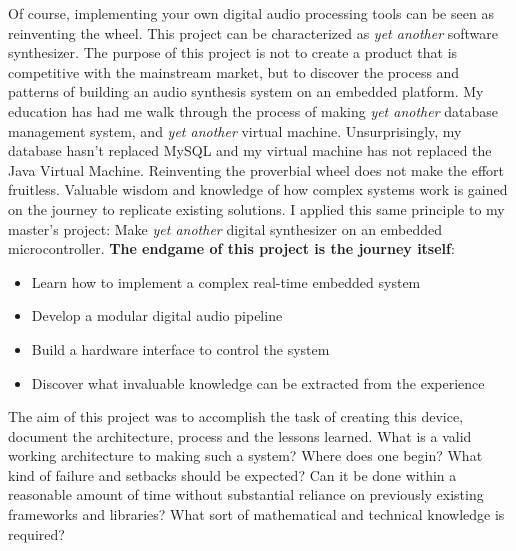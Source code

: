 \documentclass[acmlarge,screen]{acmart}
\begin{document}
	Of course, implementing your own digital audio processing tools can be seen as reinventing the wheel. This project can be characterized as \textit{yet another} software synthesizer. The purpose of this project is not to create a product that is competitive with the mainstream market, but to discover the process and patterns of building an audio synthesis system on an embedded platform. My education has had me walk through the process of making \textit{yet another} database management system, and \textit{yet another} virtual machine. Unsurprisingly, my database hasn't replaced MySQL and my virtual machine has not replaced the Java Virtual Machine. Reinventing the proverbial wheel does not make the effort fruitless. Valuable wisdom and knowledge of how complex systems work is gained on the journey to replicate existing solutions. I applied this same principle to my master's project: Make \textit{yet another} digital synthesizer on an embedded microcontroller. \textbf{The endgame of this project is the journey itself}:
	\begin{itemize}
		\item Learn how to implement a complex real-time embedded system
		\item Develop a modular digital audio pipeline
		\item Build a hardware interface to control the system
		\item Discover what invaluable knowledge can be extracted from the experience
	\end{itemize}
	The aim of this project was to accomplish the task of creating this device, document the architecture, process and the lessons learned. What is a valid working architecture to making such a system? Where does one begin? What kind of failure and setbacks should be expected? Can it be done within a reasonable amount of time without substantial reliance on previously existing frameworks and libraries? What sort of mathematical and technical knowledge is required?
	
\end{document}

